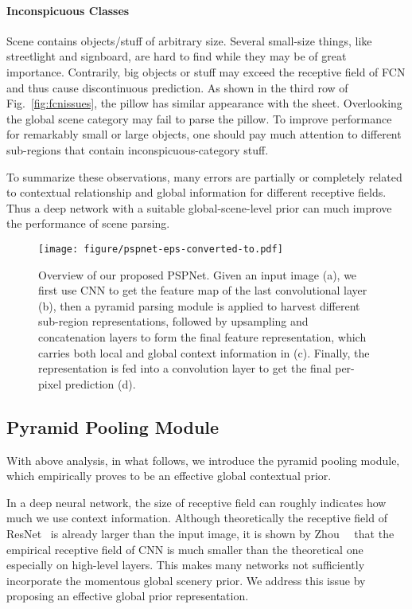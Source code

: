 \documentclass[10pt,twocolumn,letterpaper]{article}
\begin{document}
\paragraph{Inconspicuous Classes}%
Scene contains objects/stuff of arbitrary size. Several small-size things, like
streetlight and signboard, are hard to find while they may be of great importance.
Contrarily, big objects or stuff may exceed the receptive field of FCN and thus cause
discontinuous prediction. As shown in the third row of Fig.~\ref{fig:fcnissues}, the
pillow has similar appearance with the sheet. Overlooking the global scene category may
fail to parse the pillow. To improve performance for remarkably small or large objects,
one should pay much attention to different sub-regions that contain
inconspicuous-category stuff.

To summarize these observations, many errors are partially or completely related to
contextual relationship and global information for different receptive fields. Thus a
deep network with a suitable global-scene-level prior can much improve the performance of
scene parsing.

\begin{figure*}
\begin{center}
\texttt{[image: figure/pspnet-eps-converted-to.pdf]}
\end{center}
\caption{Overview of our proposed PSPNet. Given an input image (a), we first use CNN to
get the feature map of the last convolutional layer (b), then a pyramid parsing module is
applied to harvest different sub-region representations, followed by upsampling and
concatenation layers to form the final feature representation, which carries both local
and global context information in (c). Finally, the representation is fed into a
convolution layer to get the final per-pixel prediction (d).} \label{fig:pspnet}
\end{figure*}


\subsection{Pyramid Pooling Module}

With above analysis, in what follows, we introduce the pyramid pooling module, which
empirically proves to be an effective global contextual prior.

In a deep neural network, the size of receptive field can roughly indicates how much we
use context information. Although theoretically the receptive field of
ResNet~\cite{he2015deep} is already larger than the input image, it is shown by
Zhou~\etal~\cite{zhou2014object} that the empirical receptive field of CNN is much
smaller than the theoretical one especially on high-level layers. This makes many
networks not sufficiently incorporate the momentous global scenery prior. We address this
issue by proposing an effective global prior representation.
\end{document}
